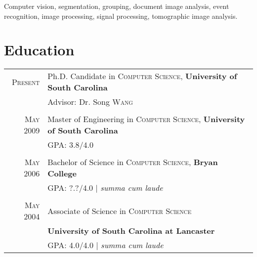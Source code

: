 \documentclass[a4paper,10pt]{article}
\begin{document}
Computer vision, segmentation, grouping, document image analysis, event recognition, image processing, signal processing, tomographic image analysis.

\section{Education}
\begin{tabular}{r p{12cm}}	
 \textsc{Present} & Ph.D. Candidate in \textsc{Computer Science}, \textbf{University of South Carolina}\\
&%
\small Advisor: Dr. Song \textsc{Wang} %
\\&\\
 \textsc{May} 2009 & Master of Engineering in \textsc{Computer Science}, \textbf{University of South Carolina}\\
&\normalsize \textsc{GPA}: 3.8/4.0
\\&\\
\textsc{May} 2006& Bachelor of Science in \textsc{Computer Science}, \textbf{Bryan College} \\
&\normalsize \textsc{GPA}: ?.?/4.0 | \small\emph{summa cum laude}
\\&\\
\textsc{May} 2004& Associate of Science in \textsc{Computer Science}\\
&\textbf{University of South Carolina at Lancaster} \\
&\normalsize \textsc{GPA}: 4.0/4.0 | \small\emph{summa cum laude}\\
\end{tabular}
\end{document}
